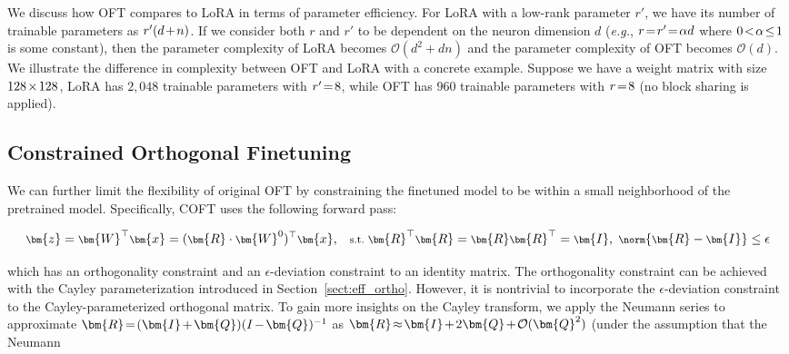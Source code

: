 We discuss how OFT compares to LoRA in terms of parameter efficiency. For LoRA with a low-rank parameter $r'$, we have its number of trainable parameters as $\thickmuskip=2mu \medmuskip=2mu r'(d+n)$. If we consider both $r$ and $r'$ to be dependent on the neuron dimension $d$ (\emph{e.g.}, $\thickmuskip=2mu \medmuskip=2mu r=r'=\alpha d$ where $\thickmuskip=2mu \medmuskip=2mu 0<\alpha\leq 1$ is some constant), then the parameter complexity of LoRA becomes $\mathcal{O}(d^2+dn)$ and the parameter complexity of OFT becomes $\mathcal{O}(d)$. We illustrate the difference in complexity between OFT and LoRA with a concrete example. Suppose we have a weight matrix with size $\thickmuskip=2mu \medmuskip=2mu 128\times 128$, LoRA has $2,048$ trainable parameters with $\thickmuskip=2mu \medmuskip=2mu r'=8$, while OFT has $960$ trainable parameters with $\thickmuskip=2mu \medmuskip=2mu r=8$ (no block sharing is applied).

\subsection{Constrained Orthogonal Finetuning}

We can further limit the flexibility of original OFT by constraining the finetuned model to be within a small neighborhood of the pretrained model. Specifically, COFT uses the following forward pass:

\begin{equation}\label{eq:coft_general}
    \footnotesize
    \bm{z}=\bm{W}^\top\bm{x}=(\bm{R}\cdot\bm{W}^0)^\top\bm{x},~~~\text{s.t.}~\bm{R}^\top\bm{R}=\bm{R}\bm{R}^\top=\bm{I},~\norm{\bm{R}-\bm{I}}\leq \epsilon
\end{equation}

which has an orthogonality constraint and an $\epsilon$-deviation constraint to an identity matrix. The orthogonality constraint can be achieved with the Cayley parameterization introduced in Section~\ref{sect:eff_ortho}. However, it is nontrivial to incorporate the $\epsilon$-deviation constraint to the Cayley-parameterized orthogonal matrix. To gain more insights on the Cayley transform, we apply the Neumann series to approximate $\thickmuskip=2mu \medmuskip=2mu \bm{R}=(\bm{I}+\bm{Q})(I-\bm{Q})^{-1}$ as $\thickmuskip=2mu \medmuskip=2mu \bm{R}\approx\bm{I}+2\bm{Q}+\mathcal{O}(\bm{Q}^2)$ (under the assumption that the Neumann  {\parfillskip=0pt\par}


